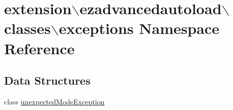 \hypertarget{namespaceextension_1_1ezadvancedautoload_1_1classes_1_1exceptions}{\section{extension$\backslash$ezadvancedautoload$\backslash$classes$\backslash$exceptions Namespace Reference}
\label{namespaceextension_1_1ezadvancedautoload_1_1classes_1_1exceptions}
}
\subsection*{Data Structures}
\begin{DoxyCompactItemize}
\item 
class \hyperlink{classextension_1_1ezadvancedautoload_1_1classes_1_1exceptions_1_1unexpected_mode_exception}{unexpected\-Mode\-Exception}
\end{DoxyCompactItemize}
